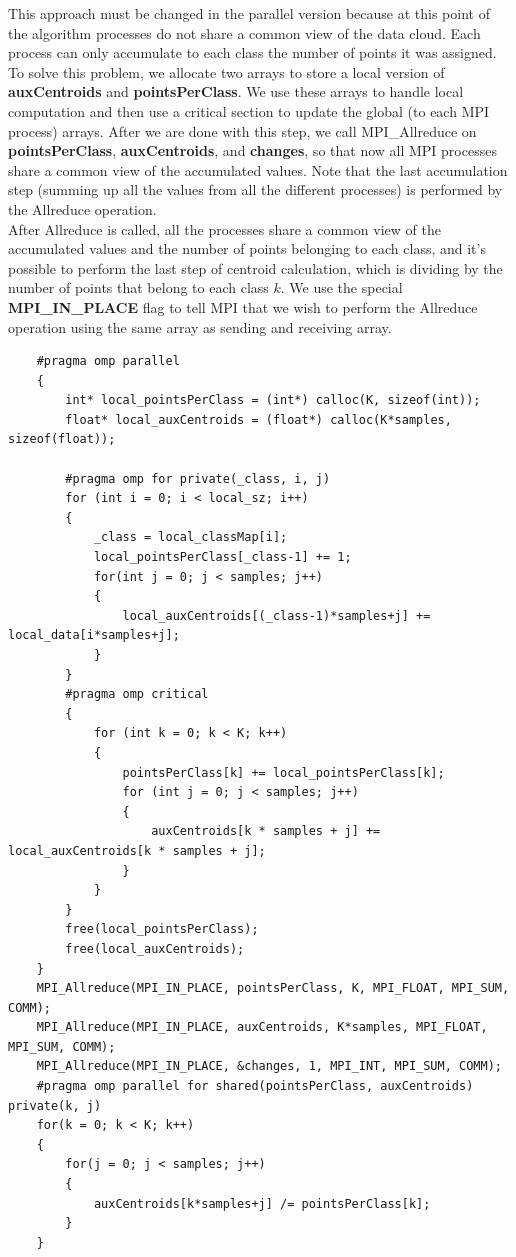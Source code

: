 \documentclass{article}
\begin{document}
This approach must be changed in the parallel version because at this point of the algorithm processes do not share a common view of the data cloud. Each process can only accumulate to each class the number of points it was assigned. To solve this problem, we allocate two arrays to store a local version of \textbf{auxCentroids} and \textbf{pointsPerClass}. We use these arrays to handle local computation and then use a critical section to update the global (to each MPI process) arrays. After we are done with this step, we call MPI\_Allreduce on \textbf{pointsPerClass}, \textbf{auxCentroids}, and \textbf{changes}, so that now all MPI processes share a common view of the accumulated values. Note that the last accumulation step (summing up all the values from all the different processes) is performed by the Allreduce operation. \\After Allreduce is called, all the processes share a common view of the accumulated values and the number of points belonging to each class, and it's possible to perform the last step of centroid calculation, which is dividing by the number of points that belong to each class $k$. We use the special \textbf{MPI\_IN\_PLACE} flag to tell MPI that we wish to perform the Allreduce operation using the same array as sending and receiving array.
\begin{lstlisting}
    #pragma omp parallel
    {
        int* local_pointsPerClass = (int*) calloc(K, sizeof(int));
        float* local_auxCentroids = (float*) calloc(K*samples, sizeof(float));

        #pragma omp for private(_class, i, j)
        for (int i = 0; i < local_sz; i++)
        {
            _class = local_classMap[i];
            local_pointsPerClass[_class-1] += 1;
            for(int j = 0; j < samples; j++)
            {
                local_auxCentroids[(_class-1)*samples+j] += local_data[i*samples+j];
            }
        }
        #pragma omp critical
        {
            for (int k = 0; k < K; k++)
            {
                pointsPerClass[k] += local_pointsPerClass[k];
                for (int j = 0; j < samples; j++)
                {
                    auxCentroids[k * samples + j] += local_auxCentroids[k * samples + j];
                }
            }
        }
        free(local_pointsPerClass);
        free(local_auxCentroids);
    }
    MPI_Allreduce(MPI_IN_PLACE, pointsPerClass, K, MPI_FLOAT, MPI_SUM, COMM);
    MPI_Allreduce(MPI_IN_PLACE, auxCentroids, K*samples, MPI_FLOAT, MPI_SUM, COMM);
    MPI_Allreduce(MPI_IN_PLACE, &changes, 1, MPI_INT, MPI_SUM, COMM);
    #pragma omp parallel for shared(pointsPerClass, auxCentroids) private(k, j)
    for(k = 0; k < K; k++)
    {
        for(j = 0; j < samples; j++)
        {
            auxCentroids[k*samples+j] /= pointsPerClass[k];
        }
    }
\end{lstlisting}
\end{document}

